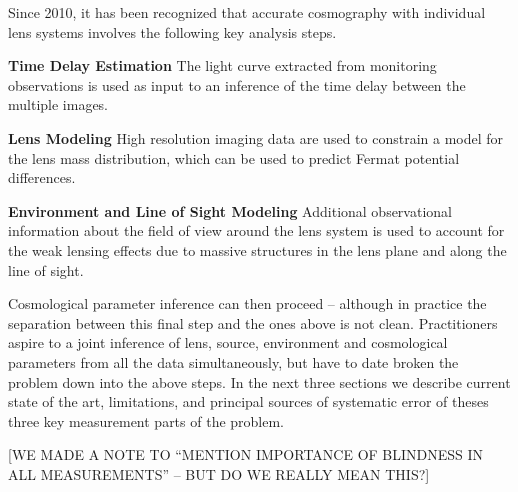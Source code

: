 Since 2010, it has been recognized that accurate cosmography with
individual lens systems involves the following key analysis steps.

\begin{description}
    \item{\bf Time Delay Estimation} The light curve extracted from
    monitoring observations is used as input to an inference of the
    time delay between the multiple images.
    \item{\bf Lens Modeling} High resolution imaging data are used to
    constrain a model for the lens mass distribution, which can be used
    to predict Fermat potential differences.
    \item{\bf Environment and Line of Sight Modeling} Additional observational
    information about the field of view around the lens system is used
    to account for the weak lensing effects due to massive structures in
    the lens plane and along the line of sight.
\end{description}

Cosmological parameter inference can then proceed -- although in
practice the  separation between this final step and the ones above is
not clean. Practitioners aspire to a joint inference of lens, source,
environment and cosmological parameters from all the data
simultaneously, but have to date broken the problem down  into the above
steps. In the next three sections we describe current state of the art,
limitations, and principal sources of systematic error of theses three
key measurement parts of the problem.

[WE MADE A NOTE TO ``MENTION IMPORTANCE OF BLINDNESS IN ALL
MEASUREMENTS'' -- BUT DO WE REALLY MEAN THIS?]
